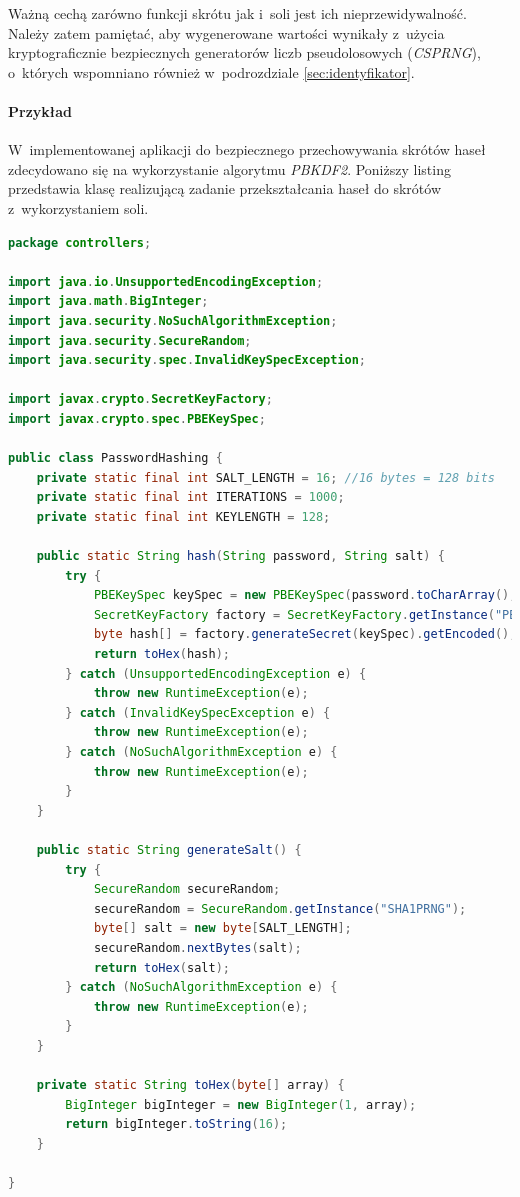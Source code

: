 \documentclass[11pt]{aghdpl}
\begin{document}
Ważną cechą zarówno funkcji skrótu jak i~soli jest ich nieprzewidywalność. Należy zatem pamiętać, aby wygenerowane wartości wynikały z~użycia kryptograficznie bezpiecznych generatorów liczb pseudolosowych (\emph{CSPRNG}), o~których wspomniano również w~podrozdziale \ref{sec:identyfikator}.

\paragraph{Przykład}

W~implementowanej aplikacji do bezpiecznego przechowywania skrótów haseł zdecydowano się na wykorzystanie algorytmu \emph{PBKDF2}. Poniższy listing przedstawia klasę realizującą zadanie przekształcania haseł do skrótów z~wykorzystaniem soli.

\begin{lstlisting}[language=Java]
package controllers;

import java.io.UnsupportedEncodingException;
import java.math.BigInteger;
import java.security.NoSuchAlgorithmException;
import java.security.SecureRandom;
import java.security.spec.InvalidKeySpecException;

import javax.crypto.SecretKeyFactory;
import javax.crypto.spec.PBEKeySpec;

public class PasswordHashing {
	private static final int SALT_LENGTH = 16; //16 bytes = 128 bits
	private static final int ITERATIONS = 1000;
	private static final int KEYLENGTH = 128;

	public static String hash(String password, String salt) {
		try {
			PBEKeySpec keySpec = new PBEKeySpec(password.toCharArray(), salt.getBytes("UTF-8"), ITERATIONS, KEYLENGTH);
			SecretKeyFactory factory = SecretKeyFactory.getInstance("PBKDF2WithHmacSHA1");
			byte hash[] = factory.generateSecret(keySpec).getEncoded();
			return toHex(hash);
		} catch (UnsupportedEncodingException e) {
			throw new RuntimeException(e);
		} catch (InvalidKeySpecException e) {
			throw new RuntimeException(e);
		} catch (NoSuchAlgorithmException e) {
			throw new RuntimeException(e);
		}
	}

	public static String generateSalt() {
		try {
			SecureRandom secureRandom;
			secureRandom = SecureRandom.getInstance("SHA1PRNG");
			byte[] salt = new byte[SALT_LENGTH];
			secureRandom.nextBytes(salt);
			return toHex(salt);
		} catch (NoSuchAlgorithmException e) {
			throw new RuntimeException(e);
		}
	}
	
	private static String toHex(byte[] array) {
		BigInteger bigInteger = new BigInteger(1, array);
		return bigInteger.toString(16);
	}
	
}
\end{lstlisting}
\end{document}
